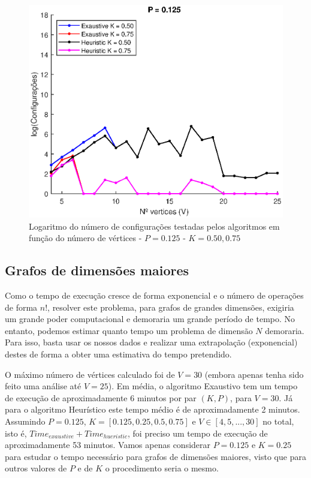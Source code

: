 \documentclass{revdetua}
\begin{document}
\begin{figure}[h!]
\centering
\includegraphics[scale = 0.5]{Figs/Conf_2_P0125.eps}
\caption{Logaritmo do número de configurações testadas pelos algoritmos em função do número de vértices - $P = 0.125$ - $K = 0.50, 0.75$}
\label{Conf_2_P0125}
\end{figure}

\subsection{Grafos de dimensões maiores}

Como o tempo de execução cresce de forma exponencial e o número de operações de forma $n!$, resolver este problema, para grafos de grandes dimensões, exigiria um grande poder computacional e demoraria um grande período de tempo. No entanto, podemos estimar quanto tempo um problema de dimensão $N$ demoraria. Para isso, basta usar os nossos dados e realizar uma extrapolação (exponencial) destes de forma a obter uma estimativa do tempo pretendido.

O máximo número de vértices calculado foi de $V = 30$ (embora apenas tenha sido feito uma análise até $V = 25$). Em média, o algoritmo Exaustivo tem um tempo de execução de  aproximadamente 6 minutos por par $(K,P)$, para $V = 30$. Já para o algoritmo Heurístico este tempo médio é de aproximadamente 2 minutos. Assumindo $P = 0.125$, $K = [0.125, 0.25, 0.5, 0.75]$ e $V \in [4,5,...,30]$ no total, isto é, $Time_{exaustive} + Time_{hueristic}$, foi preciso um tempo de execução de aproximadamente 53 minutos. Vamos apenas considerar $P = 0.125$ e $K = 0.25$ para estudar o tempo necessário para grafos de dimensões maiores, visto que para outros valores de $P$ e de $K$ o procedimento seria o mesmo.
\end{document}
